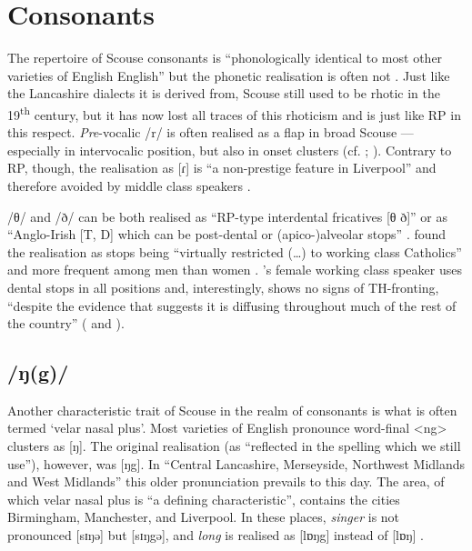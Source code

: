 	\section{Consonants}\label{sec.var.con}

The repertoire of Scouse consonants is ``phonologically identical to most other varieties of English English'' but the phonetic realisation is often not \citep[351]{watson2007}.
Just like the Lancashire dialects it is derived from, Scouse still used to be rhotic in the 19\textsuperscript{th} century, but it has now lost all traces of this rhoticism \citep[cf.][149]{knowles1997} and is just like RP in this respect.
\emph{Pre}-vocalic /r/ is often realised as a flap in broad Scouse --- especially in intervocalic position, but also in onset clusters (cf. \citealt[107 and 329--330]{knowles1973}; \citealt[352]{watson2007}).
Contrary to RP, though, the realisation as [ɾ] is ``a non-prestige feature in Liverpool'' and therefore avoided by middle class speakers \citep[329]{knowles1973}.

/θ/ and /ð/ can be both realised as ``RP-type interdental fricatives [θ ð]'' or as ``Anglo-Irish [T, D] which can be post-dental or (apico-)alveolar stops'' \citep[323]{knowles1973}.
\citeauthor{knowles1973} found the realisation as stops being ``virtually restricted (\ldots) to working class Catholics'' and more frequent among men than women \citep[323--324]{knowles1973}.
\citeauthor{watson2007}'s \citeyearpar{watson2007} female working class speaker uses dental stops in all positions and, interestingly, shows no signs of TH-fronting, ``despite the evidence that suggests it is diffusing throughout much of the rest of the country'' (\citealp[cf.][352]{watson2007} and \citeyear[227--228]{watson2007a}).

		\subsection{/ŋ(g)/}\label{sec.var.con.ng}

Another characteristic trait of Scouse in the realm of consonants is what is often termed `velar nasal plus'.
Most varieties of English pronounce word-final <ng> clusters as [ŋ].
The original realisation (as ``reflected in the spelling which we still use''), however, was [ŋg]. In ``Central Lancashire, Merseyside, Northwest Midlands and West Midlands'' this older pronunciation prevails to this day. 
The area, of which velar nasal plus is ``a defining characteristic'', contains the cities Birmingham, Manchester, and Liverpool.
In these places, \emph{singer} is not pronounced [sɪŋə] but [sɪŋgə], and \emph{long} is realised as [lɒŋg] instead of [lɒŋ] \citep[cf.][58]{trudgill1999}.

